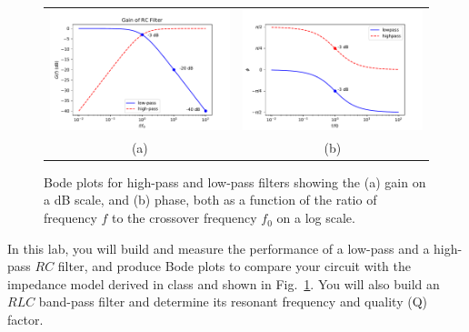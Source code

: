 \begin{figure}[htbp]
\begin{center}
\begin{tabular}{cc}
\includegraphics[height=0.22\textheight]{figs/labs/filters/rcgaindb.pdf}
&
\includegraphics[height=0.22\textheight]{figs/labs/filters/rcphase.pdf} \\
(a) & (b) \\
\end{tabular}
\end{center}
\caption{\label{fig:bode} Bode plots for high-pass and low-pass filters showing the (a) gain on a dB scale, and (b) phase, both as a function of the ratio of frequency $f$ to the crossover frequency $f_0$ on a log scale.}
\end{figure}

In this lab, you will build and measure the performance of a low-pass
and a high-pass $RC$ filter, and produce Bode plots to compare your
circuit with the impedance model derived in class and shown in
Fig.~\ref{fig:bode}.  You will also build an $RLC$ band-pass filter and
determine its resonant frequency and quality (Q) factor.

